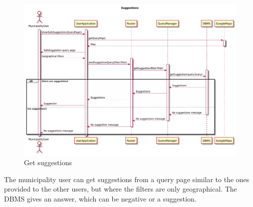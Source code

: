 \documentclass[./main.tex]{subfiles}
\begin{document}
\begin{figure}[H]
\centering
\includegraphics[width=\textwidth]{resources/sequence_diagrams/suggestions}
\caption{Get suggestions}
\end{figure}


The municipality user can get suggestions from a query page similar to the ones provided to the other users, but where the filters are only geographical. The DBMS gives an answer, which can be negative or a suggestion.
\end{document}
